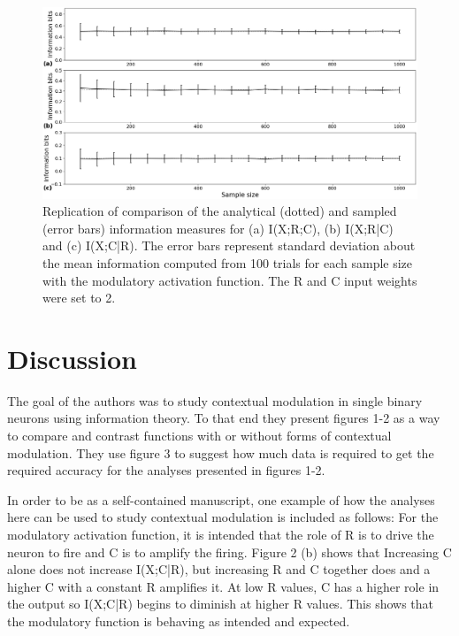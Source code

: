 \begin{figure}[H]
    \includegraphics[width=\textwidth]{figure_3.png}
      \caption{Replication of comparison of the analytical (dotted) and sampled (error bars) information measures for (a) I(X;R;C), (b) I(X;R|C) and (c) I(X;C|R). The error bars represent standard deviation about the mean information computed from 100 trials for each sample size with the modulatory activation function. The R and C input weights were set to 2.}
\end{figure}

\section{Discussion}

The goal of the authors was to study contextual modulation in single binary neurons using information theory. To that end they present figures 1-2 as a way to compare and contrast functions with or without forms of contextual modulation. They use figure 3 to suggest how much data is required to get the required accuracy for the analyses presented in figures 1-2. \newline

In order to be as a self-contained manuscript, one example of how the analyses here can be used to study contextual modulation is included as follows: For the modulatory activation function, it is intended that the role of R is to drive the neuron to fire and C is to amplify the firing. Figure 2 (b) shows that Increasing C alone does not increase I(X;C|R), but increasing R and C together does and a higher C with a constant R amplifies it. At low R values, C has a higher role in the output so I(X;C|R) begins to diminish at higher R values. This shows that the modulatory function is behaving as intended and expected. \newline

